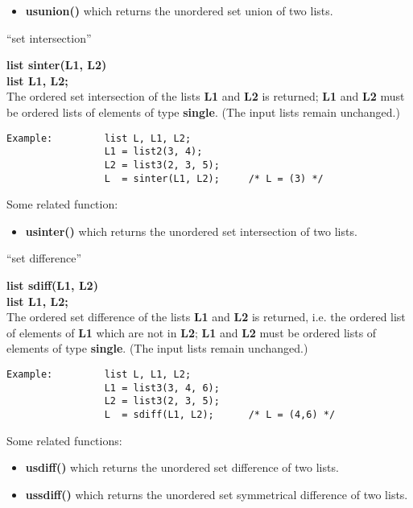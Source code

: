 \begin{itemize}
\item[] {\bf usunion() }which returns the unordered set union of two lists.
\end{itemize}

\leer
\begin{center} ``set intersection'' \end{center}
{\bf list sinter(L1, L2)\\
list L1, L2;}\\[2ex]
The ordered set intersection of the lists {\bf L1} and {\bf L2}
is returned; {\bf L1} and {\bf L2} must be ordered lists of elements
of type {\bf single}. (The input lists remain unchanged.)

\begin{verbatim}
Example:         list L, L1, L2;
                 L1 = list2(3, 4);
                 L2 = list3(2, 3, 5);
                 L  = sinter(L1, L2);     /* L = (3) */
\end{verbatim}

Some related function:

\begin{itemize}
\item[] {\bf usinter()} which returns the unordered set
intersection of two lists.
\end{itemize}

\newpage

\begin{center} ``set difference'' \end{center}
{\bf list sdiff(L1, L2)\\
list L1, L2;}\\[2ex]
The ordered set difference of the lists {\bf L1} and {\bf L2} is
returned, i.e. the ordered list of elements of {\bf L1} which
are not in {\bf L2}; {\bf L1} and {\bf L2} must be ordered lists of
elements of type {\bf single}. (The input lists remain unchanged.)

\begin{verbatim}
Example:         list L, L1, L2;
                 L1 = list3(3, 4, 6);
                 L2 = list3(2, 3, 5); 
                 L  = sdiff(L1, L2);      /* L = (4,6) */
\end{verbatim}

Some related functions:

\begin{itemize}
\item[] {\bf usdiff()} which returns the unordered set difference
of two lists.
\item[] {\bf ussdiff()} which returns the unordered set symmetrical
difference of two lists.
\end{itemize}

